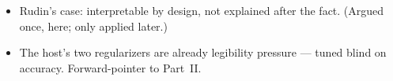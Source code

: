 \begin{itemize}
    \item Rudin's case: interpretable by design, not explained after the fact. (Argued once, here; only applied later.)
    \item The host's two regularizers are already legibility pressure — tuned blind on accuracy. Forward-pointer to Part~II.
\end{itemize}

